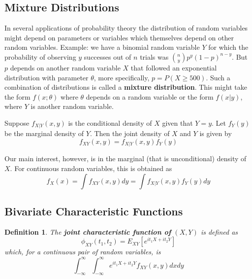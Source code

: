 \documentclass{article}
\newtheorem{definition}{Definition}[section]
\begin{document}
\subsection{Mixture Distributions}

In several applications of probability theory the distribution of random variables might depend on parameters or variables which themselves depend on other random variables. Example: we have a binomial random variable \(Y\) for which the probability of observing \(y\) successes out of \(n\) trials was \(\binom{n}{y}p^y(1-p)^{n-y}\). But \(p\) depends on another random variable \(X\) that followed an exponential distribution with parameter \(\theta\), more specifically, \(p=P(X \geq 500)\). Such a combination of distributions is called a \textbf{mixture distribution}. This might take the form \(f(x;\theta)\) where \(\theta\) depends on a random variable or the form \(f(x|y)\), where \(Y\) is another random variable.

Suppose \(f_{X|Y}(x,y)\) is the conditional density of \(X\) given that \(Y=y\). Let \(f_Y(y)\) be the marginal density of \(Y\). Then the joint density of \(X\) and \(Y\) is given by
\begin{equation*}
    f_{XY}(x,y)=f_{X|Y}(x,y)f_Y(y)
\end{equation*}

Our main interest, however, is in the marginal (that is unconditional) density of \(X\). For continuous random variables, this is obtained as
\begin{equation*}
    f_X(x)=\int f_{XY}(x,y)dy=\int f_{X|Y}(x,y) f_Y(y)dy
\end{equation*}

\subsection{Bivariate Characteristic Functions}

\begin{definition}
    The \textbf{joint characteristic function of} \((X,Y)\) is defined as
    \begin{equation*}
        \phi_{XY}(t_1,t_2)=E_{XY} \left[e^{i t_1 X+i t_2 Y} \right]
    \end{equation*}
    which, for a continuous pair of random variables, is
    \begin{equation*}
        \int_{-\infty}^{\infty} \int_{-\infty}^{\infty} e^{i t_1 X+i t_2 Y} f_{XY}(x,y) dx dy
    \end{equation*}
\end{definition}
\end{document}
